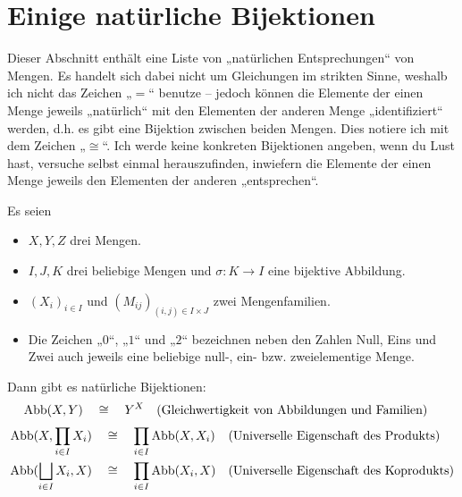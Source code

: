 \section{Einige natürliche Bijektionen}
Dieser Abschnitt enthält eine Liste von „natürlichen Entsprechungen“ von Mengen. Es handelt sich dabei nicht um Gleichungen im strikten Sinne, weshalb ich nicht das Zeichen „$=$“ benutze -- jedoch können die Elemente der einen Menge jeweils „natürlich“ mit den Elementen der anderen Menge „identifiziert“ werden, d.h. es gibt eine Bijektion zwischen beiden Mengen. Dies notiere ich mit dem Zeichen „$\cong$“. Ich werde keine konkreten Bijektionen angeben, wenn du Lust hast, versuche selbst einmal herauszufinden, inwiefern die Elemente der einen Menge jeweils den Elementen der anderen „entsprechen“.

Es seien
\begin{itemize}
    \item $X,Y,Z$ drei Mengen.
    \item $I,J,K$ drei beliebige Mengen und $\sigma : K\to I$ eine bijektive Abbildung.
    \item $(X_i)_{i\in I}$ und $(M_{ij})_{(i,j)\in I\times J}$ zwei Mengenfamilien.
    \item Die Zeichen „$0$“, „$1$“ und „$2$“ bezeichnen neben den Zahlen Null, Eins und Zwei auch jeweils eine beliebige null-, ein- bzw. zweielementige Menge.
\end{itemize}
Dann gibt es natürliche Bijektionen:
\begingroup
\allowdisplaybreaks
\begin{align*}
    \operatorname{Abb}(X,Y) & \quad\cong\quad Y^X && (\text{Gleichwertigkeit von Abbildungen und Familien})
\end{align*}
\begin{align*}
    \operatorname{Abb}(X,\prod_{i\in I} X_i) & \quad\cong\quad \prod_{i\in I} \operatorname{Abb}(X,X_i) && (\text{Universelle Eigenschaft des Produkts}) \\
    \operatorname{Abb}(\bigsqcup_{i\in I} X_i,X) & \quad\cong\quad \prod_{i\in I} \operatorname{Abb}(X_i,X) && (\text{Universelle Eigenschaft des Koprodukts})
\end{align*}
